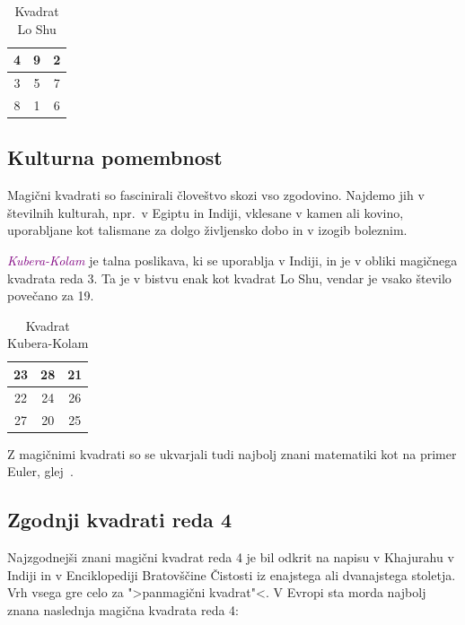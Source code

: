 \documentclass[a4paper,12pt]{article}
\theoremstyle{definition}
\theoremstyle{plain}
\newcommand{\pojem}[1]{\textcolor{purple}{\emph{#1}}}
\begin{document}
\begin{table}[!ht]
   \centering
   \caption{Kvadrat Lo Shu}
   \label{table:loshu}
   \begin{tabular}{|c|c|c|}
       \hline
       4 & 9 & 2 \\\hline
       3 & 5 & 7 \\\hline
       8 & 1 & 6 \\\hline
   \end{tabular}
\end{table}

\subsection{Kulturna pomembnost}

Magični kvadrati so fascinirali človeštvo skozi vso zgodovino. Najdemo jih
v številnih kulturah, npr.\ v Egiptu in Indiji, vklesane v kamen ali
kovino, uporabljane kot talismane za dolgo življensko dobo in v
izogib boleznim.

\pojem{Kubera-Kolam} je talna poslikava, ki se uporablja v Indiji, in je v
obliki magičnega kvadrata reda 3. Ta je v bistvu enak kot kvadrat
Lo Shu, vendar je vsako število povečano za 19.

\begin{table}[!ht]
   \centering
   \caption{Kvadrat Kubera-Kolam}
   \label{table:kubera}
   \begin{tabular}{|c|c|c|}
       \hline
       23 & 28 & 21 \\\hline
       22 & 24 & 26 \\\hline
       27 & 20 & 25 \\\hline
   \end{tabular}
\end{table}
Z magičnimi kvadrati so se ukvarjali tudi najbolj znani matematiki kot na
primer Euler, glej~\cite{euler}.


\subsection{Zgodnji kvadrati reda 4}

Najzgodnejši znani magični kvadrat reda 4 je bil odkrit na napisu
v Khajurahu v Indiji in v Enciklopediji Bratovščine Čistosti iz enajstega
ali dvanajstega stoletja. Vrh vsega gre celo za ">panmagični kvadrat"<.
V Evropi sta morda najbolj znana naslednja magična kvadrata reda 4:
\end{document}
